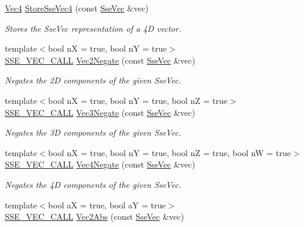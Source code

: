 \begin{DoxyCompactItemize}
\hyperlink{classgfxmath_1_1_vec4}{Vec4} \hyperlink{group___s_i_m_d_vec_math_ga7796c47cfb06233edc63cf9f331f437c}{Store\+Sse\+Vec4} (const \hyperlink{namespacegfxmath_a0de2243e2b8d0fd46d3af5e036423004}{Sse\+Vec} \&vec)
\begin{DoxyCompactList}\small\item\em Stores the Sse\+Vec representation of a 4\+D vector. \end{DoxyCompactList}\item 
{\footnotesize template$<$bool n\+X = true, bool n\+Y = true$>$ }\\\hyperlink{ssevec__math__defs_8h_a97454f977a5281455cecacce1e8ba670}{S\+S\+E\+\_\+\+V\+E\+C\+\_\+\+C\+A\+L\+L} \hyperlink{group___s_i_m_d_vec_math_ga6282fa159691ae4d727443d1ce33c403}{Vec2\+Negate} (const \hyperlink{namespacegfxmath_a0de2243e2b8d0fd46d3af5e036423004}{Sse\+Vec} \&vec)
\begin{DoxyCompactList}\small\item\em Negates the 2\+D components of the given Sse\+Vec. \end{DoxyCompactList}\item 
{\footnotesize template$<$bool n\+X = true, bool n\+Y = true, bool n\+Z = true$>$ }\\\hyperlink{ssevec__math__defs_8h_a97454f977a5281455cecacce1e8ba670}{S\+S\+E\+\_\+\+V\+E\+C\+\_\+\+C\+A\+L\+L} \hyperlink{group___s_i_m_d_vec_math_ga4336d462fab1c81e24ede5524dc42fd7}{Vec3\+Negate} (const \hyperlink{namespacegfxmath_a0de2243e2b8d0fd46d3af5e036423004}{Sse\+Vec} \&vec)
\begin{DoxyCompactList}\small\item\em Negates the 3\+D components of the given Sse\+Vec. \end{DoxyCompactList}\item 
{\footnotesize template$<$bool n\+X = true, bool n\+Y = true, bool n\+Z = true, bool n\+W = true$>$ }\\\hyperlink{ssevec__math__defs_8h_a97454f977a5281455cecacce1e8ba670}{S\+S\+E\+\_\+\+V\+E\+C\+\_\+\+C\+A\+L\+L} \hyperlink{group___s_i_m_d_vec_math_ga90514fd8b92db14a3e7bcc24919c60dc}{Vec4\+Negate} (const \hyperlink{namespacegfxmath_a0de2243e2b8d0fd46d3af5e036423004}{Sse\+Vec} \&vec)
\begin{DoxyCompactList}\small\item\em Negates the 4\+D components of the given Sse\+Vec. \end{DoxyCompactList}\item 
{\footnotesize template$<$bool a\+X = true, bool a\+Y = true$>$ }\\\hyperlink{ssevec__math__defs_8h_a97454f977a5281455cecacce1e8ba670}{S\+S\+E\+\_\+\+V\+E\+C\+\_\+\+C\+A\+L\+L} \hyperlink{group___s_i_m_d_vec_math_ga497ee900cf75d92c569c100d4048198c}{Vec2\+Abs} (const \hyperlink{namespacegfxmath_a0de2243e2b8d0fd46d3af5e036423004}{Sse\+Vec} \&vec)

\end{DoxyCompactItemize}

